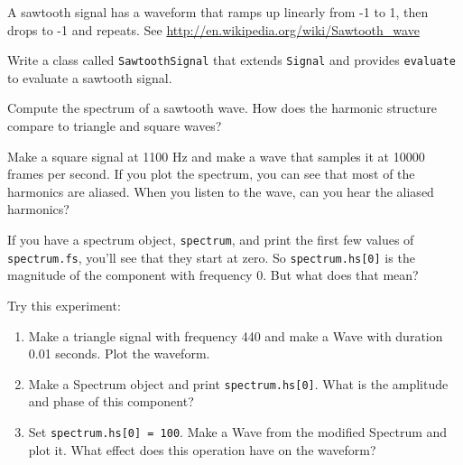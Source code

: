 \documentclass[12pt]{book}
\begin{document}
\begin{exercise}
A sawtooth signal has a waveform that ramps up linearly from -1 to 1,
then drops to -1 and repeats. See
\url{http://en.wikipedia.org/wiki/Sawtooth_wave}

Write a class called
{\tt SawtoothSignal} that extends {\tt Signal} and provides
{\tt evaluate} to evaluate a sawtooth signal.

Compute the spectrum of a sawtooth wave.  How does the harmonic
structure compare to triangle and square waves?
\end{exercise}

\begin{exercise}
Make a square signal at 1100 Hz and make a wave that samples it
at 10000 frames per second.  If you plot the spectrum, you can
see that most of the harmonics are aliased.
When you listen to the wave, can you hear the aliased harmonics?  
\end{exercise}


\begin{exercise}
If you have a spectrum object, {\tt spectrum}, and print the
first few values of {\tt spectrum.fs}, you'll see that they
start at zero.  So {\tt spectrum.hs[0]} is the magnitude
of the component with frequency 0.  But what does that mean?

Try this experiment:

\begin{enumerate}

\item Make a triangle signal with frequency 440 and make
a Wave with duration 0.01 seconds.  Plot the waveform.

\item Make a Spectrum object and print {\tt spectrum.hs[0]}.
What is the amplitude and phase of this component?

\item Set {\tt spectrum.hs[0] = 100}.  Make a Wave from the
modified Spectrum and plot it.  What effect does this operation
have on the waveform?

\end{enumerate}

\end{exercise}
\end{document}

